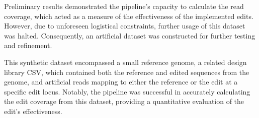 \documentclass{bioinfo}
\theoremstyle{definition}
\begin{document}
Preliminary results demonstrated the pipeline's capacity to calculate the read coverage, which acted as a measure of the effectiveness of the implemented edits.
However, due to unforeseen logistical constraints, further usage of this dataset was halted. Consequently, an artificial dataset was constructed for further testing and refinement.

This synthetic dataset encompassed a small reference genome, a related design library CSV, which contained both the reference and edited sequences from the genome, and artificial reads mapping to either the reference or the edit at a specific edit locus. 
Notably, the pipeline was successful in accurately calculating the edit coverage from this dataset, providing a quantitative evaluation of the edit's effectiveness.


%
\end{document}
